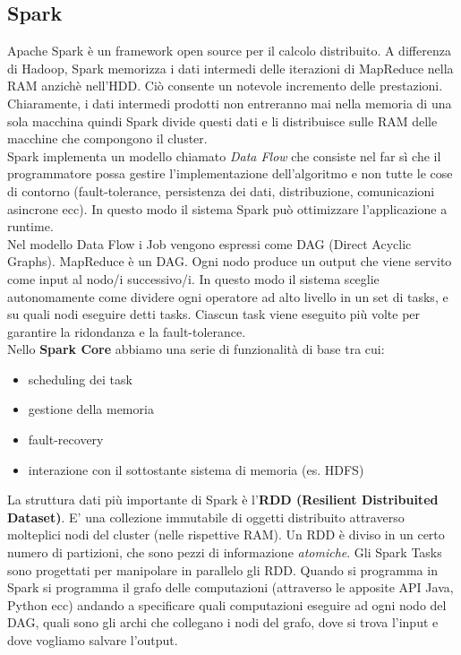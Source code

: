 \documentclass{article}
\begin{document}
\begin{appendices}
\section{Spark}
Apache Spark è un framework open source per il calcolo distribuito. A differenza di Hadoop, Spark memorizza i dati intermedi delle iterazioni di MapReduce nella RAM anzichè nell'HDD. Ciò consente un notevole incremento delle prestazioni. Chiaramente, i dati intermedi prodotti non entreranno mai nella memoria di una sola macchina quindi Spark divide questi dati e li distribuisce sulle RAM delle macchine che compongono il cluster. \\
Spark implementa un modello chiamato \textit{Data Flow} che consiste nel far sì che il programmatore possa gestire l'implementazione dell'algoritmo e non tutte le cose di contorno (fault-tolerance, persistenza dei dati, distribuzione, comunicazioni asincrone ecc). In questo modo il sistema Spark può ottimizzare l'applicazione a runtime. \\
Nel modello Data Flow i Job vengono espressi come DAG (Direct Acyclic Graphs). MapReduce è un DAG. Ogni nodo produce un output che viene servito come input al nodo/i successivo/i. In questo modo il sistema sceglie autonomamente come dividere ogni operatore ad alto livello in un set di tasks, e su quali nodi eseguire detti tasks. Ciascun task viene eseguito più volte per garantire la ridondanza e la fault-tolerance. \\
Nello \textbf{Spark Core} abbiamo una serie di funzionalità di base tra cui:
\begin{itemize}
    \item scheduling dei task
    \item gestione della memoria
    \item fault-recovery
    \item interazione con il sottostante sistema di memoria (es. HDFS)
\end{itemize}
La struttura dati più importante di Spark è l'\textbf{RDD (Resilient Distribuited Dataset)}. E' una collezione immutabile di oggetti distribuito attraverso molteplici nodi del cluster (nelle rispettive RAM). Un RDD è diviso in un certo numero di partizioni, che sono pezzi di informazione \textit{atomiche}. Gli Spark Tasks sono progettati per manipolare in parallelo gli RDD. Quando si programma in Spark si programma il grafo delle computazioni (attraverso le apposite API Java, Python ecc) andando a specificare quali computazioni eseguire ad ogni nodo del DAG, quali sono gli archi che collegano i nodi del grafo, dove si trova l'input e dove vogliamo salvare l'output.\\

\end{appendices}
\end{document}
